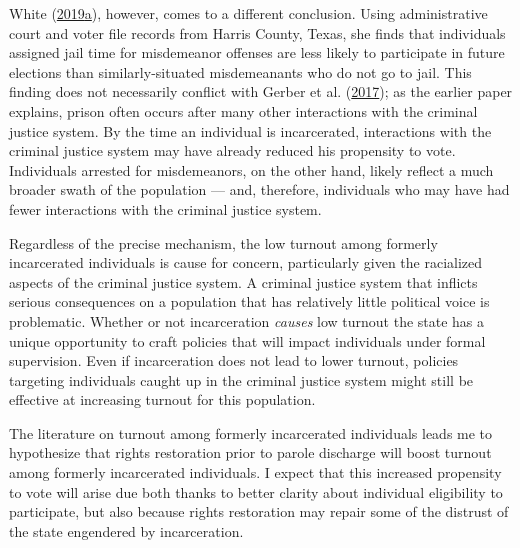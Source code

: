 \documentclass[
  12pt,
]{article}
\begin{document}
White (\protect\hyperlink{ref-White2019}{2019}\protect\hyperlink{ref-White2019}{a}), however, comes to a different conclusion. Using administrative court and voter file records from Harris County, Texas, she finds that individuals assigned jail time for misdemeanor offenses are less likely to participate in future elections than similarly-situated misdemeanants who do not go to jail. This finding does not necessarily conflict with Gerber et al. (\protect\hyperlink{ref-Gerber2017}{2017}); as the earlier paper explains, prison often occurs after many other interactions with the criminal justice system. By the time an individual is incarcerated, interactions with the criminal justice system may have already reduced his propensity to vote. Individuals arrested for misdemeanors, on the other hand, likely reflect a much broader swath of the population --- and, therefore, individuals who may have had fewer interactions with the criminal justice system.

Regardless of the precise mechanism, the low turnout among formerly incarcerated individuals is cause for concern, particularly given the racialized aspects of the criminal justice system. A criminal justice system that inflicts serious consequences on a population that has relatively little political voice is problematic. Whether or not incarceration \emph{causes} low turnout the state has a unique opportunity to craft policies that will impact individuals under formal supervision. Even if incarceration does not lead to lower turnout, policies targeting individuals caught up in the criminal justice system might still be effective at increasing turnout for this population.

The literature on turnout among formerly incarcerated individuals leads me to hypothesize that rights restoration prior to parole discharge will boost turnout among formerly incarcerated individuals. I expect that this increased propensity to vote will arise due both thanks to better clarity about individual eligibility to participate, but also because rights restoration may repair some of the distrust of the state engendered by incarceration.
\end{document}
